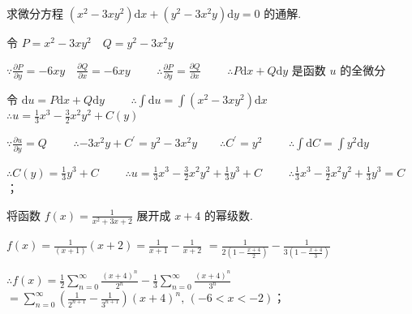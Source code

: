 \begin{problem}[points = 6]
求微分方程 $(x^2 - 3xy^2)\mathrm{d}x + (y^2 - 3x^2y)\mathrm{d}y = 0$ 的通解.
\end{problem}
\begin{solution}
    令 $P = x^2 - 3xy^2 \quad Q = y^2 - 3x^2y$

    $\because \frac{\partial P}{\partial y} = -6 xy \quad \frac{\partial Q}{\partial x} = -6xy \qquad$
    $\therefore \frac{\partial P}{\partial y} = \frac{\partial Q}{\partial x} \qquad$
    $\therefore P\mathrm{d}x + Q\mathrm{d}y$ 是函数 $u$ 的全微分

    令 $\mathrm{d}u = P\mathrm{d}x + Q\mathrm{d}y \qquad$
    $\therefore \int \mathrm{d}u = \int (x^2 - 3xy^2)\mathrm{d}x \qquad$
    $\therefore u = \frac{1}{3}x^3 - \frac{3}{2}x^2y^2 + C(y)$

    $\because \frac{\partial u}{\partial y} = Q \qquad$
    $\therefore -3x^2y + C^{\prime} = y^2 -3x^2y \qquad \therefore C^{\prime} = y^2 \qquad$
    $\therefore \int \mathrm{d}C = \int y^2\mathrm{d}y$

    $\therefore C(y) = \frac{1}{3}y^3 + C \qquad$
    $\therefore u = \frac{1}{3}x^3 - \frac{3}{2}x^2y^2 + \frac{1}{3}y^3 + C \qquad$
    $\therefore \frac{1}{3}x^3 - \frac{3}{2}x^2y^2 + \frac{1}{3}y^3 = C$；
\end{solution}

\begin{problem}[points = 7]
将函数 $f(x) = \frac{1}{x^2 + 3x + 2}$ 展开成 $x + 4$ 的幂级数.
\end{problem}
\begin{solution}
    $f(x) = \frac{1}{(x + 1)}(x + 2) = \frac{1}{x + 1} - \frac{1}{x + 2}$
    $= \frac{1}{2\left(1 - \frac{x + 4}{2}\right)} - \frac{1}{3\left(1 - \frac{x +  4}{3}\right)}$

    $\therefore f(x) = \frac{1}{2}\sum\limits_{n = 0}^{\infty} \frac{(x + 4)^n}{2^n} - \frac{1}{3}\sum\limits_{n = 0}^{\infty} \frac{(x + 4)^n}{3^n}$
    $= \sum\limits_{n = 0}^{\infty} \left(\frac{1}{2^{n + 1}} - \frac{1}{3^{n + 1}}\right)(x + 4)^n ,\, (-6 < x < -2)$；
\end{solution}

